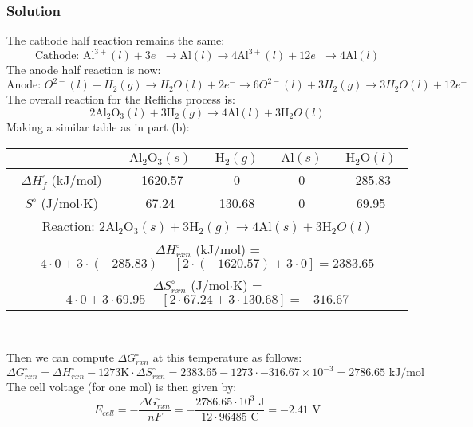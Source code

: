 \documentclass[12pt]{article}
\begin{document}
\subsubsection{Solution}
The cathode half reaction remains the same:
\begin{equation}
\text{Cathode: } \mathrm{Al}^{3+}(l)+3 e
^{-} \rightarrow \mathrm{Al}(l) \to 4 \mathrm{Al}^{3+}(l)+12 e^{-} \rightarrow 4 \mathrm{Al}(l)
\end{equation}
The anode half reaction is now:
\begin{equation}
\text{Anode: } O^{2-}(l) + H_{2}(g) \rightarrow H_{2}O(l) + 2 e^{-} \to 6 O^{2-}(l) + 3 H_{2}(g) \rightarrow 3 H_{2}O(l) + 12 e^{-}
\end{equation}
The overall reaction for the Reffichs process is:
\begin{equation}
2 \mathrm{Al}_{2} \mathrm{O}_{3}(l)+3 \mathrm{H}_{2}(g) \rightarrow 4 \mathrm{Al}(l)+3 \mathrm{H}_{2}O(l)
\end{equation}
Making a similar table as in part (b):
\begin{center}
\begin{tabular}{|c|c|c|c|c|}
\hline
    & $\mathrm{Al_{2}O_{3}}(s)$ & $\mathrm{H_{2}}(g)$ & $\mathrm{Al}(s)$ & $\mathrm{H_{2}O}(l)$ \\
\hline
$\Delta H_{f}^{\circ}$ (kJ/mol) & -1620.57 & 0 & 0 & -285.83 \\
\hline
$S^{\circ}$ (J/mol$\cdot$K) & 67.24 & 130.68 & 0 & 69.95 \\
\hline
\multicolumn{5}{|c|}{Reaction: $2 \mathrm{Al
}_{2} \mathrm{O}_{3}(s)+3 \mathrm{H}_{2}(g) \rightarrow 4 \mathrm{Al}(s)+3 \mathrm{H}_{2}O(l)$} \\
\hline
\multicolumn{5}{|c|}{$\Delta H_{rxn}^{\circ}$ (kJ/mol) = $4 \cdot 0 + 3 \cdot (-285.83) - [2 \cdot (-1620.57) + 3 \cdot 0] = 2383.65 $} \\
\hline
\multicolumn{5}{|c|}{$\Delta S_{rxn}^{\circ}$ (J/mol$\cdot$K) = $4 \cdot 0 + 3 \cdot 69.95 - [2 \cdot 67.24 + 3 \cdot 130.68] = -316.67$} \\
\hline
\end{tabular}\\
\end{center}
Then we can compute $\Delta G_{rxn}^{\circ}$ at this temperature as follows:
\begin{equation}
\Delta G_{rxn}^{\circ} = \Delta H_{rxn}^{\circ} - 1273 \mathrm{K} \cdot \Delta S_{rxn}^{\circ} = 2383.65 - 1273 \cdot -316.67 \times 10^{-3} = 2786.65 \text{ kJ/mol}
\end{equation}
The cell voltage (for one mol) is then given by:
\begin{equation}E_{cell} = -\frac{\Delta G_{rxn}^{\circ}}{nF} = -\frac{2786.65 \cdot 10^{3} \text{ J}}{12 \cdot 96485 \text{ C}} = -2.41 \text{ V}
\end{equation}
\end{document}
